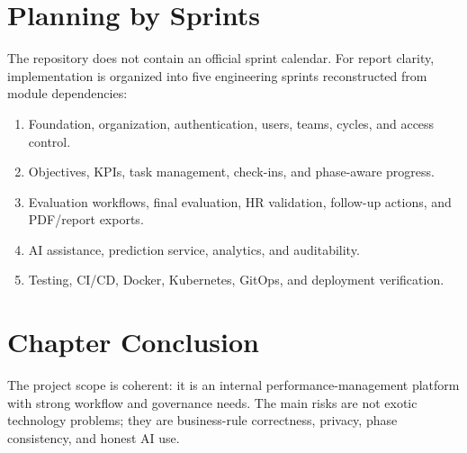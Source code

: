 \section{Planning by Sprints}
The repository does not contain an official sprint calendar. For report clarity, implementation is organized into five engineering sprints reconstructed from module dependencies:
\begin{enumerate}
\item Foundation, organization, authentication, users, teams, cycles, and access control.
\item Objectives, KPIs, task management, check-ins, and phase-aware progress.
\item Evaluation workflows, final evaluation, HR validation, follow-up actions, and PDF/report exports.
\item AI assistance, prediction service, analytics, and auditability.
\item Testing, CI/CD, Docker, Kubernetes, GitOps, and deployment verification.
\end{enumerate}

\section{Chapter Conclusion}
The project scope is coherent: it is an internal performance-management platform with strong workflow and governance needs. The main risks are not exotic technology problems; they are business-rule correctness, privacy, phase consistency, and honest AI use.

